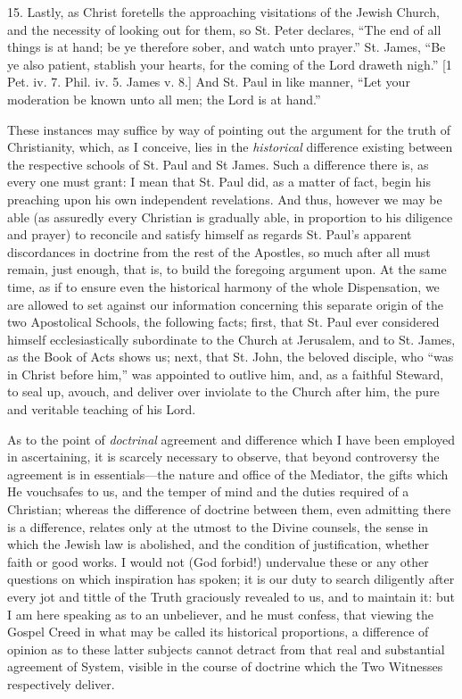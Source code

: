 15. Lastly, as Christ foretells the approaching visitations of the
Jewish Church, and the necessity of looking out for them, so St. Peter
declares, ``The end of all things is at hand; be ye therefore sober,
and watch unto prayer.'' St. James, ``Be ye also patient,
stablish your hearts, for the coming of the Lord draweth nigh.'' [1
Pet. iv. 7. Phil. iv. 5. James v. 8.] And St. Paul in like manner,
``Let your moderation be known unto all men; the Lord is at
hand.''

These instances may suffice by way of pointing out the argument for
the truth of Christianity, which, as I conceive, lies in the \emph{historical}
difference existing between the respective schools of St. Paul and St
James. Such a difference there is, as every one must grant: I mean that
St. Paul did, as a matter of fact, begin his preaching upon his own
independent revelations. And thus, however we may be able (as assuredly
every Christian is gradually able, in proportion to his diligence and
prayer) to reconcile and satisfy himself as regards St. Paul's apparent
discordances in doctrine from the rest of the Apostles, so much after
all must remain, just enough, that is, to build the foregoing argument
upon. At the same time, as if to ensure even the historical harmony of
the whole Dispensation, we are allowed to set against our information
concerning this separate origin of the two Apostolical Schools, the
following facts; first, that St. Paul ever considered himself
ecclesiastically subordinate to the Church at Jerusalem, and to St.
James, as the Book of Acts shows us; next, that St. John, the beloved
disciple, who ``was in Christ before him,'' was appointed to
outlive him, and, as a faithful Steward, to seal up, avouch, and deliver
over inviolate to the Church after him, the pure and veritable teaching
of his Lord.

As to the point of \emph{doctrinal} agreement and difference which I
have been employed in ascertaining, it is scarcely necessary to observe,
that beyond controversy the agreement is in essentials—the nature and
office of the Mediator, the gifts which He vouchsafes to us, and the
temper of mind and the duties required of a Christian; whereas the
difference of doctrine between them, even admitting there is a
difference, relates only at the utmost to the Divine counsels, the sense
in which the Jewish law is abolished, and the condition of
justification, whether faith or good works. I would not (God forbid!)
undervalue these or any other questions on which inspiration has spoken;
it is our duty to search diligently after every jot and tittle of the
Truth graciously revealed to us, and to maintain it: but I am here
speaking as to an unbeliever, and he must confess, that viewing the
Gospel Creed in what may be called its historical proportions, a
difference of opinion as to these latter subjects cannot detract from
that real and substantial agreement of System, visible in the course of
doctrine which the Two Witnesses respectively deliver.

